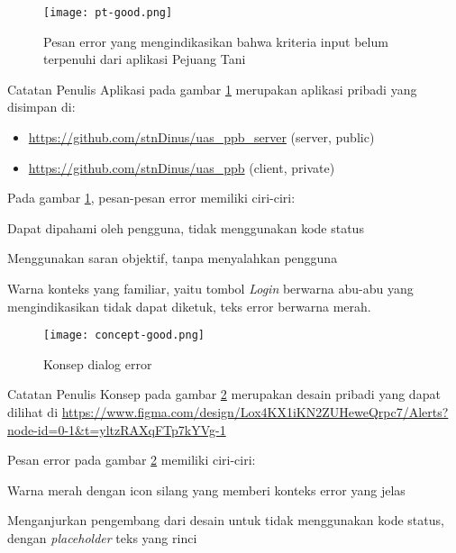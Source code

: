 \begin{figure}[H]
  \centering
  \texttt{[image: pt-good.png]}
  \caption{Pesan error yang mengindikasikan bahwa kriteria input
  belum terpenuhi dari aplikasi Pejuang Tani}
  \label{fig:good-err4}
\end{figure}
\begin{info}{Catatan Penulis}
  Aplikasi pada gambar \ref{fig:good-err4} merupakan aplikasi pribadi
  yang disimpan di:
  \begin{itemize}
    \item \url{https://github.com/stnDinus/uas_ppb_server} (server, public)
    \item \url{https://github.com/stnDinus/uas_ppb} (client, private)
  \end{itemize}
\end{info}
Pada gambar \ref{fig:good-err4}, pesan-pesan error memiliki ciri-ciri:
\begin{pros}
\item Dapat dipahami oleh pengguna, tidak menggunakan kode status
\item Menggunakan saran objektif, tanpa menyalahkan pengguna
\item Warna konteks yang familiar, yaitu tombol \textit{Login}
  berwarna abu-abu yang mengindikasikan tidak dapat diketuk, teks
  error berwarna merah.
\end{pros}

\begin{figure}[H]
  \centering
  \texttt{[image: concept-good.png]}
  \caption{Konsep dialog error}
  \label{fig:good-err5}
\end{figure}
\begin{info}{Catatan Penulis}
  Konsep pada gambar \ref{fig:good-err5} merupakan desain pribadi
  yang dapat dilihat di
  \url{https://www.figma.com/design/Lox4KX1iKN2ZUHeweQrpc7/Alerts?node-id=0-1&t=yltzRAXqFTp7kYVg-1}
\end{info}
Pesan error pada gambar \ref{fig:good-err5} memiliki ciri-ciri:
\begin{pros}
\item Warna merah dengan icon silang yang memberi konteks error yang jelas
\item Menganjurkan pengembang dari desain untuk tidak menggunakan
  kode status, dengan \textit{placeholder} teks yang rinci
\end{pros}
